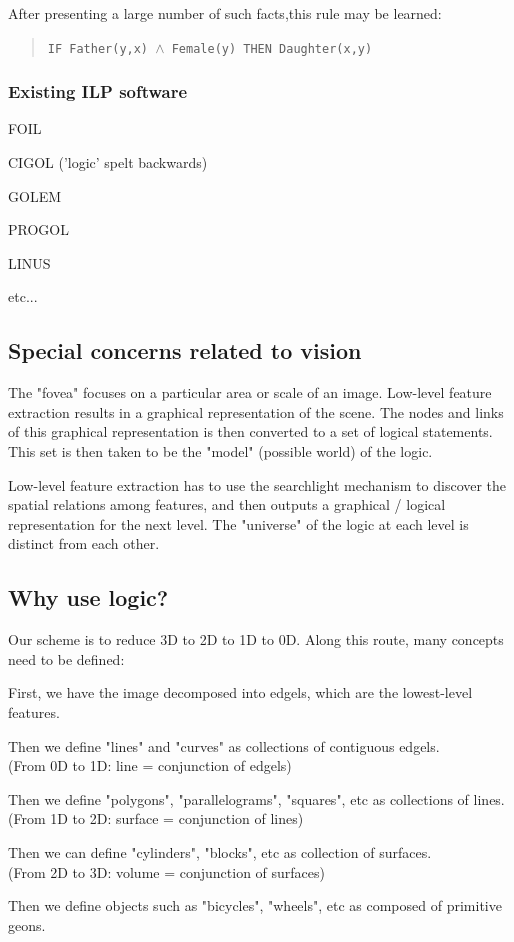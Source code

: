 After presenting a large number of such facts,this rule may be learned:
\begin{quote}

\texttt{IF Father(y,x) $\wedge$ Female(y) THEN Daughter(x,y)}
\end{quote}

\subsubsection{Existing ILP software}
\begin{compactenum}
	\item FOIL
	\item  CIGOL ('logic' spelt backwards)
	\item GOLEM
	\item  PROGOL
	\item LINUS
	\item etc...
\end{compactenum}

\subsection{Special concerns related to vision}

The "fovea" focuses on a particular area or scale of an image. Low-level feature extraction results in a graphical representation of the scene. The nodes and links of this graphical representation is then converted to a set of logical statements. This set is then taken to be the "model" (possible world) of the logic.

Low-level feature extraction has to use the searchlight mechanism to discover the spatial relations among features, and then outputs a graphical / logical representation for the next level. The "universe" of the logic at each level is distinct from each other.

\subsection{Why use logic?}

 Our scheme is to reduce 3D to 2D to 1D to 0D. Along this route, many concepts need to be defined:
\begin{compactenum}
	\item  First, we have the image decomposed into edgels, which are the lowest-level features.
	\item  Then we define "lines" and "curves" as collections of contiguous edgels.
\\
    (From 0D to 1D: line = conjunction of edgels)
	\item  Then we define "polygons", "parallelograms", "squares", etc as collections of lines.
\\
    (From 1D to 2D: surface = conjunction of lines) 
	\item  Then we can define "cylinders", "blocks", etc as collection of surfaces.
\\
    (From 2D to 3D: volume = conjunction of surfaces)
	\item Then we define objects such as "bicycles", "wheels", etc as composed of primitive geons.
\end{compactenum}

